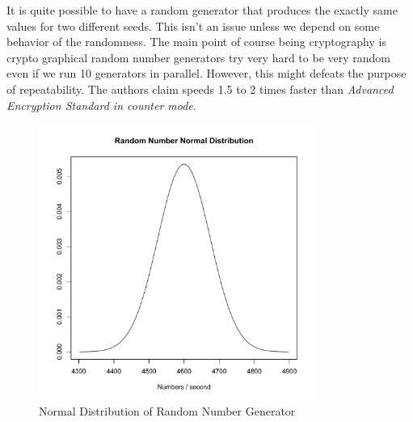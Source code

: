 \documentclass[conference]{IEEEtran}
\begin{document}
 It is quite possible to have a random generator that produces the exactly same values for two different seeds. This isn't an issue unless we depend on some behavior of the randomness. The main point of course being cryptography is crypto graphical random number generators try very hard to be very random even if we run 10 generators in parallel. However, this might defeats the purpose of repeatability. The authors claim speeds 1.5 to 2 times faster than \emph{Advanced Encryption Standard in counter mode}\cite{1347044}.

\begin{figure}[ht!]
\centering
\includegraphics[width=90mm]{images/plotRandomNumber.pdf}
\caption{Normal Distribution of Random Number Generator}
\label{fig:plotRandomNumber}
\end{figure}
 
 
\end{document}
